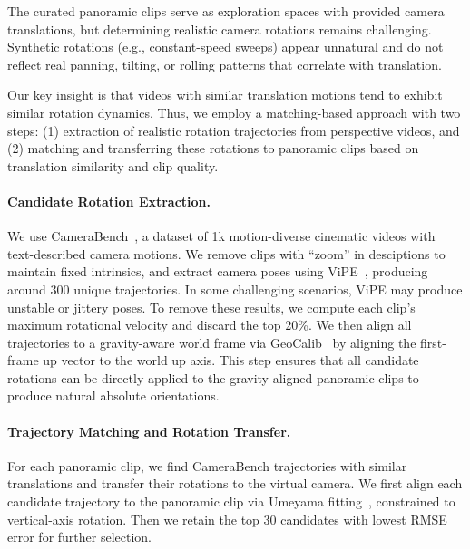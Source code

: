 The curated panoramic clips serve as exploration spaces with provided camera translations, but determining realistic camera rotations remains challenging.
Synthetic rotations (e.g., constant-speed sweeps) appear unnatural and do not reflect real panning, tilting, or rolling patterns that correlate with translation.

Our key insight is that videos with similar translation motions tend to exhibit similar rotation dynamics.
Thus, we employ a matching-based approach with two steps:
(1) extraction of realistic rotation trajectories from perspective videos, and
(2) matching and transferring these rotations to panoramic clips based on translation similarity and clip quality.


\paragraph{Candidate Rotation Extraction.}
We use CameraBench~\cite{lin2025towards}, a dataset of 1k motion-diverse cinematic videos with text-described camera motions.  
We remove clips with ``zoom'' in desciptions to maintain fixed intrinsics, and extract camera poses using ViPE~\cite{huang2025vipe}, producing around 300 unique trajectories.  
In some challenging scenarios, ViPE may produce unstable or jittery poses.
To remove these results, we compute each clip's maximum rotational velocity and discard the top 20\%.  
We then align all trajectories to a gravity-aware world frame via GeoCalib~\cite{veicht2024geocalib} by aligning the first-frame up vector to the world up axis.
This step ensures that all candidate rotations can be directly applied to the gravity-aligned panoramic clips to produce natural absolute orientations.

\paragraph{Trajectory Matching and Rotation Transfer.}
For each panoramic clip, we find CameraBench trajectories with similar translations and transfer their rotations to the virtual camera.
We first align each candidate trajectory to the panoramic clip via Umeyama fitting~\cite{umeyama2002least}, constrained to vertical-axis rotation.
Then we retain the top 30 candidates with lowest RMSE error for further selection.

